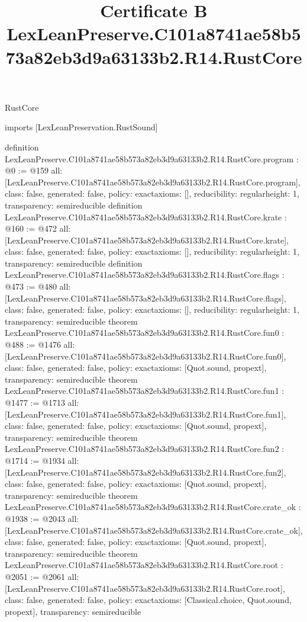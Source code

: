 \begin{lexlean}{RustCore}
\title{Certificate B LexLeanPreserve.C101a8741ae58b573a82eb3d9a63133b2.R14.RustCore}
\begin{coremodule}
imports [LexLeanPreservation.RustSound]

definition LexLeanPreserve.C101a8741ae58b573a82eb3d9a63133b2.R14.RustCore.program : @0 := @159 {
  all: [LexLeanPreserve.C101a8741ae58b573a82eb3d9a63133b2.R14.RustCore.program],
  class: false,
  generated: false,
  policy: exact{axioms: []},
  reducibility: regular{height: 1},
  transparency: semireducible
}
definition LexLeanPreserve.C101a8741ae58b573a82eb3d9a63133b2.R14.RustCore.krate : @160 := @472 {
  all: [LexLeanPreserve.C101a8741ae58b573a82eb3d9a63133b2.R14.RustCore.krate],
  class: false,
  generated: false,
  policy: exact{axioms: []},
  reducibility: regular{height: 1},
  transparency: semireducible
}
definition LexLeanPreserve.C101a8741ae58b573a82eb3d9a63133b2.R14.RustCore.flags : @473 := @480 {
  all: [LexLeanPreserve.C101a8741ae58b573a82eb3d9a63133b2.R14.RustCore.flags],
  class: false,
  generated: false,
  policy: exact{axioms: []},
  reducibility: regular{height: 1},
  transparency: semireducible
}
theorem LexLeanPreserve.C101a8741ae58b573a82eb3d9a63133b2.R14.RustCore.fun0 : @488 := @1476 {
  all: [LexLeanPreserve.C101a8741ae58b573a82eb3d9a63133b2.R14.RustCore.fun0],
  class: false,
  generated: false,
  policy: exact{axioms: [Quot.sound, propext]},
  transparency: semireducible
}
theorem LexLeanPreserve.C101a8741ae58b573a82eb3d9a63133b2.R14.RustCore.fun1 : @1477 := @1713 {
  all: [LexLeanPreserve.C101a8741ae58b573a82eb3d9a63133b2.R14.RustCore.fun1],
  class: false,
  generated: false,
  policy: exact{axioms: [Quot.sound, propext]},
  transparency: semireducible
}
theorem LexLeanPreserve.C101a8741ae58b573a82eb3d9a63133b2.R14.RustCore.fun2 : @1714 := @1934 {
  all: [LexLeanPreserve.C101a8741ae58b573a82eb3d9a63133b2.R14.RustCore.fun2],
  class: false,
  generated: false,
  policy: exact{axioms: [Quot.sound, propext]},
  transparency: semireducible
}
theorem LexLeanPreserve.C101a8741ae58b573a82eb3d9a63133b2.R14.RustCore.crate_ok : @1938 := @2043 {
  all: [LexLeanPreserve.C101a8741ae58b573a82eb3d9a63133b2.R14.RustCore.crate_ok],
  class: false,
  generated: false,
  policy: exact{axioms: [Quot.sound, propext]},
  transparency: semireducible
}
theorem LexLeanPreserve.C101a8741ae58b573a82eb3d9a63133b2.R14.RustCore.root : @2051 := @2061 {
  all: [LexLeanPreserve.C101a8741ae58b573a82eb3d9a63133b2.R14.RustCore.root],
  class: false,
  generated: false,
  policy: exact{axioms: [Classical.choice, Quot.sound, propext]},
  transparency: semireducible
}


\end{coremodule}
\end{lexlean}
